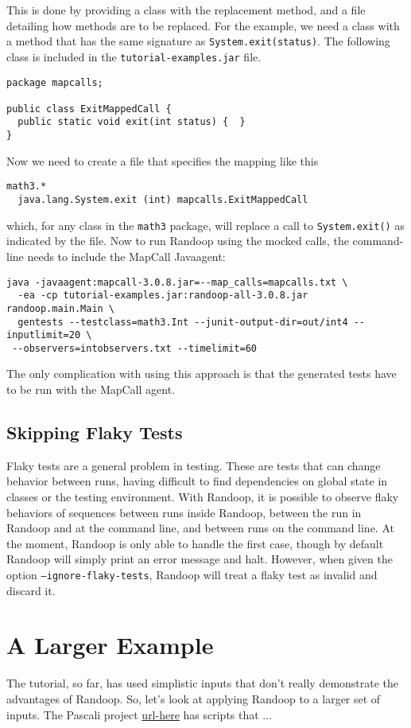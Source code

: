 \documentclass[11pt, oneside]{article} %
\newcommand{\code}[1]{{\texttt{#1}}}
\newcommand{\cmd}[1]{{\texttt{#1}}}
\begin{document}
This is done by providing a class with the replacement method, and a file detailing how methods are to be replaced.
For the example, we need a class with a method that has the same signature as \code{System.exit(status)}.
The following class is included in the \texttt{tutorial-examples.jar} file.
\vfill\pagebreak
\begin{verbatim}
package mapcalls;

public class ExitMappedCall {
  public static void exit(int status) {  }
}
\end{verbatim}
Now we need to create a file that specifies the mapping like this
\begin{verbatim}
math3.*
  java.lang.System.exit (int) mapcalls.ExitMappedCall
\end{verbatim}
which, for any class in the \code{math3} package, will replace a call to \code{System.exit()} as indicated by the file. Now to run Randoop using the mocked calls, the command-line needs to include the MapCall Javaagent:
\begin{verbatim}
java -javaagent:mapcall-3.0.8.jar=--map_calls=mapcalls.txt \
  -ea -cp tutorial-examples.jar:randoop-all-3.0.8.jar randoop.main.Main \
  gentests --testclass=math3.Int --junit-output-dir=out/int4 --inputlimit=20 \
 --observers=intobservers.txt --timelimit=60
\end{verbatim}
The only complication with using this approach is that the generated tests have to be run with the MapCall agent.


\subsection{Skipping Flaky Tests}
Flaky tests are a general problem in testing.
These are tests that can change behavior between runs, having difficult to find dependencies on global state in classes or the testing environment. 
With Randoop, it is possible to observe flaky behaviors of sequences between runs inside Randoop, between the run in Randoop and at the command line, and between runs on the command line.
At the moment, Randoop is only able to handle the first case, though by default Randoop will simply print an error message and halt.
However, when given the option \cmd{--ignore-flaky-tests}, Randoop will treat a flaky test as invalid and discard it.

\section{A Larger Example}
The tutorial, so far, has used simplistic inputs that don't really demonstrate the advantages of Randoop. 
So, let's look at applying Randoop to a larger set of inputs.
The Pascali project \url{url-here} has scripts that ...
\end{document}

